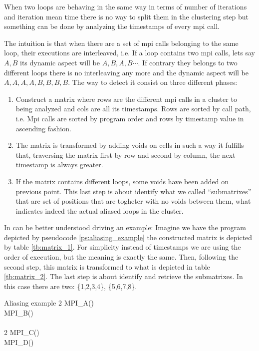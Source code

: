 When two loops are behaving in the same way in terms of number of iterations and
iteration mean time there is no way to split them in the clustering step but
something can be done by analyzing the timestamps of every mpi call.

The intuition is that when there are a set of mpi calls belonging to the same
loop, their executions are interleaved, i.e. If a loop contains two mpi calls,
lets say $A,B$ its dynamic aspect will be $A,B,A,B\cdots$. If contrary they
belongs to two different loops there is no interleaving any more and the dynamic
aspect will be $A,A,A,A,B,B,B,B$. The way to detect it consist on three
different phases:
\begin{enumerate}[label=\roman*)]
  \item Construct a matrix where rows are the different mpi calls in a cluster
    to being analyzed and cols are all its timestamps. Rows are sorted by call
    path, i.e. Mpi calls are sorted by program order and rows by timestamp value
    in ascending fashion.
  \item The matrix is transformed by adding voids on cells in such a way it
    fulfills that, traversing the matrix first by row and second by column, the
    next timestamp is always greater.
  \item If the matrix contains different loops, some voids have been added on
    previous point. This last step is about identify what we called
    ``submatrixes'' that are set of positions that are togheter with no voids
    between them, what indicates indeed the actual aliased loops in the cluster.
\end{enumerate}

In can be better understood driving an example: Imagine we have the program
depicted by pseudocode \ref{ps:aliasing_example} the constructed matrix is
depicted by table \ref{tb:matrix_1}. For simplicity instead of timestamps we are
using the order of execution, but the meaning is exactly the same. Then,
following the second step, this matrix is transformed to what is depicted in
table \ref{tb:matrix_2}. The last step is about identify and retrieve the
submatrixes. In this case there are two: \{1,2,3,4\},
\{5,6,7,8\}.

\begin{pseudocode}{Aliasing example}{ }
    \label{ps:aliasing_example}
          2 \DO
        \BEGIN
            MPI\_A() \\
            MPI\_B() \\
        \END \\
          2 \DO
        \BEGIN
            MPI\_C() \\
            MPI\_D() \\
        \END\\
\end{pseudocode}

